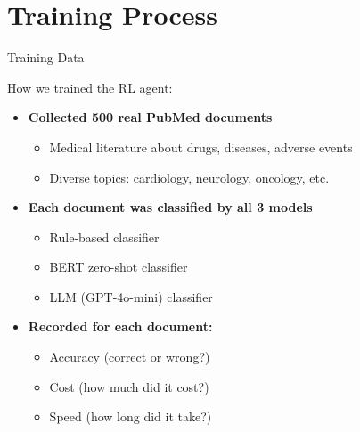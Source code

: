 \documentclass[aspectratio=169]{beamer}
\begin{document}
\section{Training Process}

\begin{frame}{Training Data}
\begin{block}{How we trained the RL agent:}
\end{block}

\vspace{0.3cm}

\begin{itemize}
    \item \textbf{Collected 500 real PubMed documents}
    \begin{itemize}
        \item Medical literature about drugs, diseases, adverse events
        \item Diverse topics: cardiology, neurology, oncology, etc.
    \end{itemize}
    
    \vspace{0.3cm}
    
    \item \textbf{Each document was classified by all 3 models}
    \begin{itemize}
        \item Rule-based classifier
        \item BERT zero-shot classifier
        \item LLM (GPT-4o-mini) classifier
    \end{itemize}
    
    \vspace{0.3cm}
    
    \item \textbf{Recorded for each document:}
    \begin{itemize}
        \item Accuracy (correct or wrong?)
        \item Cost (how much did it cost?)
        \item Speed (how long did it take?)
    \end{itemize}
\end{itemize}
\end{frame}
\end{document}
